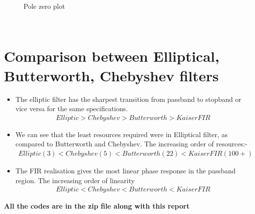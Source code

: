 \documentclass[12pt, letterpaper,]{article}
\begin{document}
\begin{figure}[!ht]
\centering
\vspace{-3mm}
\caption{Pole zero plot}
\end{figure}\\
\newpage
\section{Comparison between Elliptical, Butterworth, Chebyshev filters}
\begin{itemize}
    \item The elliptic filter has the sharpest transition from passband to stopband or vice versa for the same specifications.
    \begin{align*}
         Elliptic > Chebyshev > Butterworth > Kaiser FIR
    \end{align*}
    \item We can see that the least resources required were in Elliptical filter, as compared to Butterworth and Chebyshev. The increasing order of resources:-
    \begin{align*}
        Elliptic (3) < Chebyshev (5) < Butterworth (22) < Kaiser FIR (100+)
    \end{align*}
    
    \item The FIR realisation gives the most linear phase response in the passband region. The increasing order of linearity
    \begin{align*}
        Elliptic < Chebyshev < Butterworth < Kaiser FIR
    \end{align*}
\end{itemize}

\textbf{All the codes are in the zip file along with this report}
\end{document}
